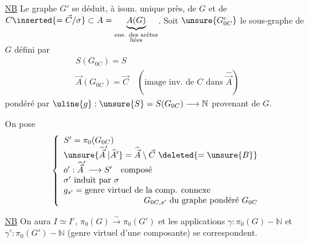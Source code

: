 \uline{NB} Le graphe  $G'$ se déduit, à isom. unique près, de $G$ et de $C\inserted{=\vec C/\sigma}\subset A=\underbrace{A(G)}_{\substack{\text{ens. des arêtes}\\\text{liées}}}$.
Soit $\unsure{G_{0C}^{c}}$ le sous-graphe de $G$ défini par
\[
\begin{array}{l}
S(G_{0C})=S\\
\vec A(G_{0C})=\vec C\quad(\text{image inv. de }C\text{ dans }\widehat{\vec A})
\end{array}
\]
pondéré par $\uline{g}:\unsure{S}=S(G_{0C})\longrightarrow\mathbb N$ provenant de $G$.

On pose
\[
\left\{\begin{array}{l}
S'=\pi_0(G_{0C})\\
\unsure{\widehat{\vec A}'|\widehat A'}=\widehat{\vec A}\setminus\vec C\ \deleted{=\unsure{B}}\\
o':\widehat{\vec A}'\longrightarrow S'\quad\text{composé}\\
\sigma'\ \text{induit par }\sigma\\
g_{s'}=\text{genre virtuel de la comp. connexe}\\
\hfill G_{0C,s'}\ \text{du graphe pondéré }G_{0C}
\end{array}\right.
\]

\uline{NB} On aura $I\simeq I'$, $\pi_0(G)\xrightarrow{\sim}\pi_0(G')$ et les applications $\gamma:\pi_0(G)-\mathbb N$ et $\gamma':\pi_0(G')-\mathbb N$ (genre virtuel d'une composante) se correspondent.

